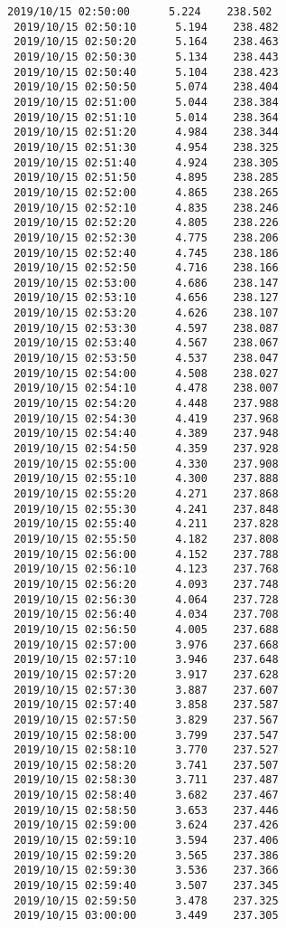 \documentclass[11pt]{article}
\begin{document}
\begin{Verbatim}[commandchars=\\\{\}]
 2019/10/15 02:50:00      5.224    238.502
 2019/10/15 02:50:10      5.194    238.482
 2019/10/15 02:50:20      5.164    238.463
 2019/10/15 02:50:30      5.134    238.443
 2019/10/15 02:50:40      5.104    238.423
 2019/10/15 02:50:50      5.074    238.404
 2019/10/15 02:51:00      5.044    238.384
 2019/10/15 02:51:10      5.014    238.364
 2019/10/15 02:51:20      4.984    238.344
 2019/10/15 02:51:30      4.954    238.325
 2019/10/15 02:51:40      4.924    238.305
 2019/10/15 02:51:50      4.895    238.285
 2019/10/15 02:52:00      4.865    238.265
 2019/10/15 02:52:10      4.835    238.246
 2019/10/15 02:52:20      4.805    238.226
 2019/10/15 02:52:30      4.775    238.206
 2019/10/15 02:52:40      4.745    238.186
 2019/10/15 02:52:50      4.716    238.166
 2019/10/15 02:53:00      4.686    238.147
 2019/10/15 02:53:10      4.656    238.127
 2019/10/15 02:53:20      4.626    238.107
 2019/10/15 02:53:30      4.597    238.087
 2019/10/15 02:53:40      4.567    238.067
 2019/10/15 02:53:50      4.537    238.047
 2019/10/15 02:54:00      4.508    238.027
 2019/10/15 02:54:10      4.478    238.007
 2019/10/15 02:54:20      4.448    237.988
 2019/10/15 02:54:30      4.419    237.968
 2019/10/15 02:54:40      4.389    237.948
 2019/10/15 02:54:50      4.359    237.928
 2019/10/15 02:55:00      4.330    237.908
 2019/10/15 02:55:10      4.300    237.888
 2019/10/15 02:55:20      4.271    237.868
 2019/10/15 02:55:30      4.241    237.848
 2019/10/15 02:55:40      4.211    237.828
 2019/10/15 02:55:50      4.182    237.808
 2019/10/15 02:56:00      4.152    237.788
 2019/10/15 02:56:10      4.123    237.768
 2019/10/15 02:56:20      4.093    237.748
 2019/10/15 02:56:30      4.064    237.728
 2019/10/15 02:56:40      4.034    237.708
 2019/10/15 02:56:50      4.005    237.688
 2019/10/15 02:57:00      3.976    237.668
 2019/10/15 02:57:10      3.946    237.648
 2019/10/15 02:57:20      3.917    237.628
 2019/10/15 02:57:30      3.887    237.607
 2019/10/15 02:57:40      3.858    237.587
 2019/10/15 02:57:50      3.829    237.567
 2019/10/15 02:58:00      3.799    237.547
 2019/10/15 02:58:10      3.770    237.527
 2019/10/15 02:58:20      3.741    237.507
 2019/10/15 02:58:30      3.711    237.487
 2019/10/15 02:58:40      3.682    237.467
 2019/10/15 02:58:50      3.653    237.446
 2019/10/15 02:59:00      3.624    237.426
 2019/10/15 02:59:10      3.594    237.406
 2019/10/15 02:59:20      3.565    237.386
 2019/10/15 02:59:30      3.536    237.366
 2019/10/15 02:59:40      3.507    237.345
 2019/10/15 02:59:50      3.478    237.325
 2019/10/15 03:00:00      3.449    237.305

    \end{Verbatim}


    
    
    
    
\end{document}
